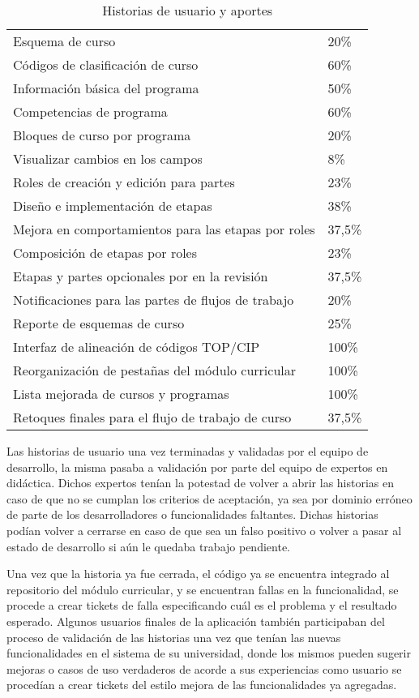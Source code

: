 \begin{table}[H]
\begin{tabular}{@{}ll@{}}
Esquema de curso                                    &  20\%  \\
Códigos de clasificación de curso                   &  60\%  \\
Información básica del programa                     &  50\%  \\
Competencias de programa                            &  60\%  \\
Bloques de curso por programa                       &  20\%  \\
Visualizar cambios en los campos                    &   8\%  \\
Roles de creación y edición para partes             &  23\%  \\
Diseño e implementación de etapas                   &  38\%  \\
Mejora en comportamientos para las etapas por roles & 37,5\% \\
Composición de etapas por roles                     &  23\%  \\
Etapas y partes opcionales por en la revisión       & 37,5\% \\
Notificaciones para las partes de flujos de trabajo &  20\%  \\
Reporte de esquemas de curso                        &  25\%  \\
Interfaz de alineación de códigos TOP/CIP           & 100\%  \\
Reorganización de pestañas del módulo curricular    & 100\%  \\
Lista mejorada de cursos y programas                & 100\%  \\
Retoques finales para el flujo de trabajo de curso  & 37,5\% \\ \bottomrule
\end{tabular}
\caption{Historias de usuario y aportes}
\label{mis-aportes}
\end{table}

Las historias de usuario una vez terminadas y validadas por el equipo de desarrollo, la misma pasaba a validación por parte del equipo de expertos en didáctica. Dichos expertos tenían la potestad de volver a abrir las historias en caso de que no se cumplan los criterios de aceptación, ya sea por dominio erróneo de parte de los desarrolladores o funcionalidades faltantes. Dichas historias podían volver a cerrarse en caso de que sea un falso positivo o volver a pasar al estado de desarrollo si aún le quedaba trabajo pendiente.

Una vez que la historia ya fue cerrada, el código ya se encuentra integrado al repositorio del módulo curricular, y se encuentran fallas en la funcionalidad, se procede a crear tickets de falla especificando cuál es el problema y el resultado esperado. Algunos usuarios finales de la aplicación también participaban del proceso de validación de las historias una vez que tenían las nuevas funcionalidades en el sistema de su universidad, donde los mismos pueden sugerir mejoras o casos de uso verdaderos de acorde a sus experiencias como usuario se procedían a crear tickets del estilo mejora de las funcionalidades ya agregadas.

